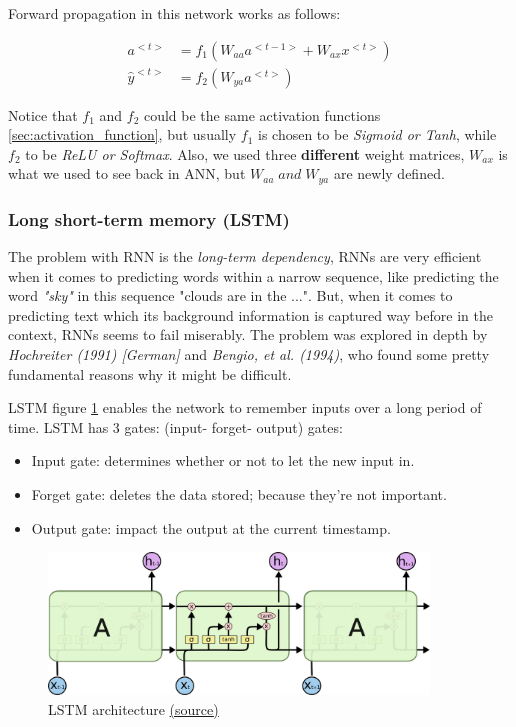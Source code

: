 Forward propagation in this network works as follows:

\begin{equation} \label{eq:simple_rnn}
\begin{split}
    a^{<t>} &= f_1 \left( W_{aa} a^{<t-1>} +  W_{ax} x^{<t>} \right) \\
    \hat{y}^{<t>} &= f_2 \left( W_{ya} a^{<t>} \right)
\end{split}
\end{equation}

Notice that $f_1$ and $f_2$ could be the same activation functions \ref{sec:activation_function}, but usually $f_1$ is chosen to be \emph{Sigmoid or Tanh}, while $f_2$ to be \emph{ReLU or Softmax}. Also, we used three \textbf{different} weight matrices, $W_{ax}$ is what we used to see back in ANN, but $W_{aa}\; and \;W_{ya}$ are newly defined.

\subsubsection{Long short-term memory (LSTM)}

The problem with RNN is the \emph{long-term dependency}, RNNs are very efficient when it comes to predicting words within a narrow sequence, like predicting the word \textit{"sky"} in this sequence "clouds are in the ...". But, when it comes to predicting text which its background information is captured way before in the context, RNNs seems to fail miserably. The problem was explored in depth by \emph{Hochreiter (1991) [German]} \cite{rnn_long_term_problem_1} and \emph{Bengio, et al. (1994)}, who found some pretty fundamental reasons why it might be difficult.\newline


LSTM figure \ref{fig:lstm} enables the network to remember inputs over a long period of time. LSTM has 3 gates: (input- forget- output) gates:
\begin{itemize}
  \item Input gate: determines whether or not to let the new input in.
  \item Forget gate: deletes the data stored; because they're not important.
  \item Output gate: impact the output at the current timestamp.
\end{itemize} 

\begin{figure}[h]
    \centering
    \includegraphics[width=0.9\textwidth]{images/lstm.png}
    \caption{LSTM architecture \href{http://colah.github.io/posts/2015-08-Understanding-LSTMs/}{(\underline{source})}}
    \label{fig:lstm}
\end{figure}


